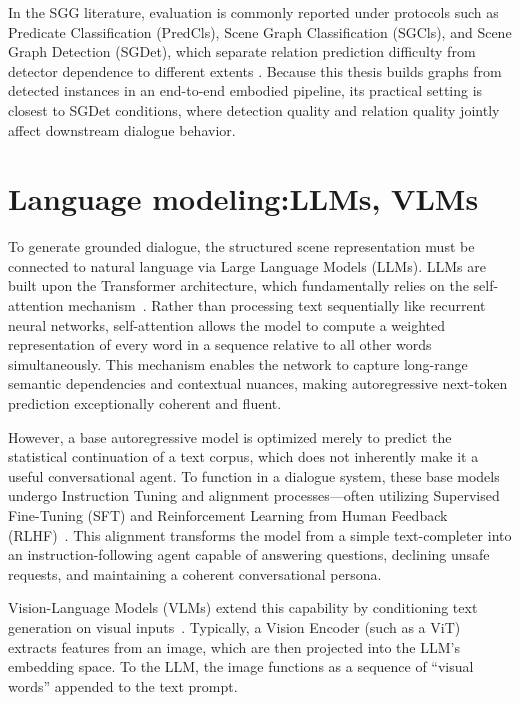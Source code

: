 In the SGG literature, evaluation is commonly reported under protocols such as Predicate Classification (PredCls), Scene Graph Classification (SGCls), and Scene Graph Detection (SGDet), which separate
relation prediction difficulty from detector dependence to different extents \cite{zhu_scene_2022}. Because this thesis builds graphs from detected instances in an end-to-end embodied pipeline, its
practical setting is closest to SGDet conditions, where detection quality and relation quality jointly affect downstream dialogue behavior.


\section{Language modeling:\@ LLMs, VLMs}

To generate grounded dialogue, the structured scene representation must be connected to natural language via Large Language Models (LLMs). LLMs are built upon the Transformer architecture, which fundamentally relies on the self-attention mechanism~\cite{vaswani2023attentionneed}. Rather than processing text sequentially like recurrent neural networks, self-attention allows the model to compute a weighted representation of every word in a sequence relative to all other words simultaneously. This mechanism enables the network to capture long-range semantic dependencies and contextual nuances, making autoregressive next-token prediction exceptionally coherent and fluent.

However, a base autoregressive model is optimized merely to predict the statistical continuation of a text corpus, which does not inherently make it a useful conversational agent. To function in a dialogue system, these base models undergo Instruction Tuning and alignment processes---often utilizing Supervised Fine-Tuning (SFT) and Reinforcement Learning from Human Feedback (RLHF)~\cite{ouyang2022traininglanguagemodelsfollow}. This alignment transforms the model from a simple text-completer into an instruction-following agent capable of answering questions, declining unsafe requests, and maintaining a coherent conversational persona.


Vision-Language Models (VLMs) extend this capability by conditioning text generation on visual inputs~\cite{liu_visual_2023, dai_instructblip_2023, driess_palm-e_2023}. Typically, a Vision Encoder (such as a ViT) extracts features from an image, which are then projected into the LLM's embedding space. To the LLM, the image functions as a sequence of ``visual words'' appended to the text prompt.

